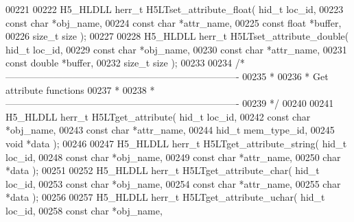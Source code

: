 \begin{DoxyCode}
00221 
00222 H5\_HLDLL herr\_t  H5LTset\_attribute\_float( hid\_t loc\_id,
00223                                 \textcolor{keyword}{const} \textcolor{keywordtype}{char} *obj\_name,
00224                                 \textcolor{keyword}{const} \textcolor{keywordtype}{char} *attr\_name,
00225                                 \textcolor{keyword}{const} \textcolor{keywordtype}{float} *buffer,
00226                                 \textcolor{keywordtype}{size\_t} size );
00227 
00228 H5\_HLDLL herr\_t  H5LTset\_attribute\_double( hid\_t loc\_id,
00229                                  \textcolor{keyword}{const} \textcolor{keywordtype}{char} *obj\_name,
00230                                  \textcolor{keyword}{const} \textcolor{keywordtype}{char} *attr\_name,
00231                                  \textcolor{keyword}{const} \textcolor{keywordtype}{double} *buffer,
00232                                  \textcolor{keywordtype}{size\_t} size );
00233 
00234 \textcolor{comment}{/*-------------------------------------------------------------------------}
00235 \textcolor{comment}{ *}
00236 \textcolor{comment}{ * Get attribute functions}
00237 \textcolor{comment}{ *}
00238 \textcolor{comment}{ *-------------------------------------------------------------------------}
00239 \textcolor{comment}{ */}
00240 
00241 H5\_HLDLL herr\_t  H5LTget\_attribute( hid\_t loc\_id,
00242                           \textcolor{keyword}{const} \textcolor{keywordtype}{char} *obj\_name,
00243                           \textcolor{keyword}{const} \textcolor{keywordtype}{char} *attr\_name,
00244                           hid\_t mem\_type\_id,
00245                           \textcolor{keywordtype}{void} *data );
00246 
00247 H5\_HLDLL herr\_t  H5LTget\_attribute\_string( hid\_t loc\_id,
00248                                  \textcolor{keyword}{const} \textcolor{keywordtype}{char} *obj\_name,
00249                                  \textcolor{keyword}{const} \textcolor{keywordtype}{char} *attr\_name,
00250                                  \textcolor{keywordtype}{char} *data );
00251 
00252 H5\_HLDLL herr\_t  H5LTget\_attribute\_char( hid\_t loc\_id,
00253                                \textcolor{keyword}{const} \textcolor{keywordtype}{char} *obj\_name,
00254                                \textcolor{keyword}{const} \textcolor{keywordtype}{char} *attr\_name,
00255                                \textcolor{keywordtype}{char} *data );
00256 
00257 H5\_HLDLL herr\_t  H5LTget\_attribute\_uchar( hid\_t loc\_id,
00258                                \textcolor{keyword}{const} \textcolor{keywordtype}{char} *obj\_name,

\end{DoxyCode}
